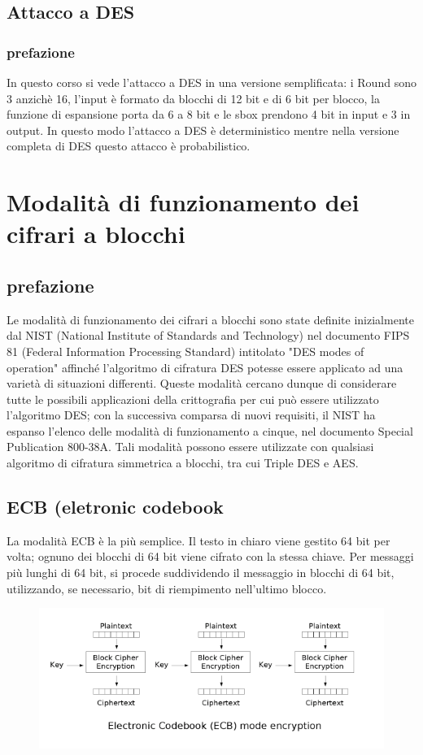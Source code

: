 \documentclass[10pt,a4paper]{article}
\begin{document}
\subsection{Attacco a DES}
\subsubsection{prefazione}
In questo corso si vede l'attacco a DES in una versione semplificata: i Round sono 3 anzichè 16, l'input è formato da blocchi di 12 bit e di 6 bit per blocco, la funzione di espansione porta da 6 a 8 bit e le sbox prendono 4 bit in input e 3 in output. In questo modo l'attacco a DES è deterministico mentre nella versione completa di DES questo attacco è probabilistico.

\section{Modalità di funzionamento dei cifrari a blocchi}
\subsection{prefazione}
Le modalità di funzionamento dei cifrari a blocchi sono state definite inizialmente dal NIST (National Institute of Standards and Technology) nel documento FIPS 81 (Federal Information Processing Standard) intitolato "DES modes of operation" affinché l'algoritmo di cifratura DES potesse essere applicato ad una varietà di situazioni differenti.
Queste modalità cercano dunque di considerare tutte le possibili applicazioni della crittografia per cui può essere utilizzato l'algoritmo DES; con la successiva comparsa di nuovi requisiti, il NIST ha espanso l'elenco delle modalità di funzionamento a cinque, nel documento Special Publication 800-38A.
Tali modalità possono essere utilizzate con qualsiasi algoritmo di cifratura simmetrica a blocchi, tra cui Triple DES e AES.
\subsection{ECB (eletronic codebook}
La modalità ECB è la più semplice. Il testo in chiaro viene gestito 64 bit per volta; ognuno dei blocchi di 64 bit viene cifrato con la stessa chiave. Per messaggi più lunghi di 64 bit, si procede suddividendo il messaggio in blocchi di 64 bit, utilizzando, se necessario, bit di riempimento nell'ultimo blocco.

\begin{figure}[htbp]
\includegraphics[scale=0.6]{immagini/ecb.png}
\end{figure}
\end{document}
